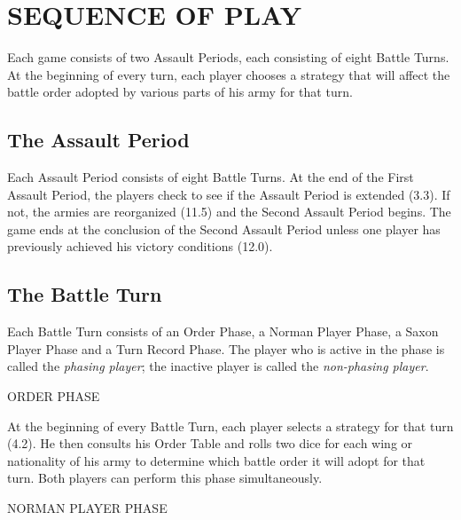 \section{SEQUENCE OF PLAY}
\hfill

Each game consists of two Assault Periods, each consisting of eight Battle Turns. At the beginning of every turn, each player chooses a strategy that will affect the battle order adopted by various parts of his army for that turn.

\subsection{The Assault Period}

Each Assault Period consists of eight Battle Turns. At the end of the First Assault Period, the players check to see if the Assault Period is extended (3.3). If not, the armies are reorganized (11.5) and the Second Assault Period begins. The game ends at the conclusion of the Second Assault Period unless one player has previously achieved his victory conditions (12.0).

\subsection{The Battle Turn}

Each Battle Turn consists of an Order Phase, a Norman Player Phase, a Saxon Player Phase and a Turn Record Phase. The player who is active in the phase is called the \textit{phasing player}; the inactive player is called the \textit{non-phasing player}.

ORDER PHASE

At the beginning of every Battle Turn, each player selects a strategy for that turn (4.2). He then consults his Order Table and rolls two dice for each wing or nationality of his army to determine which battle order it will adopt for that turn. Both players can perform this phase simultaneously.

NORMAN PLAYER PHASE

